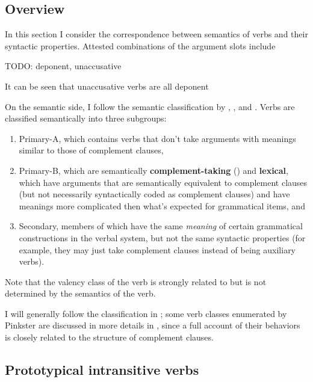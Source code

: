 \documentclass[a4paper, oneside]{report}
\newcommand*{\citesec}[1]{\S~{#1}}
\newcommand*{\citechap}[1]{chap.~{#1}}
\newcommand*{\citepages}[1]{pp.~{#1}}
\newcommand*{\concept}[1]{\textbf{#1}}
\begin{document}
\subsection{Overview}\label{sec:verb-phrase.arguments.compatibility}

In this section I consider the correspondence between  
semantics of verbs and their syntactic properties.
Attested combinations of the argument slots include 

TODO: deponent, unaccusative

It can be seen that unaccusative verbs are all deponent
\citep[\citepages{308-309}]{oniga2014latin}

On the semantic side,
I follow the semantic classification by 
\citet[Part B]{dixon2005semantic},
\citet[\citesec{18.5}]{dixon2010basic2},
and \citet[\citesec{3.3}]{dixon2009basic1}.
Verbs are classified semantically into three subgroups:
\begin{enumerate}
    \item Primary-A, which contains verbs that 
    don't take arguments with meanings similar to those of complement clauses,
    \item Primary-B, which are semantically \concept{complement-taking} () 
    and \concept{lexical},
    which have arguments that are semantically equivalent to complement clauses 
    (but not necessarily syntactically coded as complement clauses)
    and have meanings more complicated then what's expected for grammatical items, and 
    \item Secondary, members of which have the same \emph{meaning} 
    of certain grammatical constructions in the verbal system,
    but not the same syntactic properties
    (for example, they may just take complement clauses instead of being auxiliary verbs).
\end{enumerate}
Note that the valency class of the verb 
is strongly related to but is not determined by the semantics of the verb.


I will generally follow the classification in \citet[\citechap{4}]{Pinkster1};
some verb classes enumerated by Pinkster are discussed in more details 
in ,
since a full account of their behaviors is closely related to the structure of complement clauses.

\subsection{Prototypical intransitive verbs}\label{sec:prototypical-intransitive}
\end{document}
